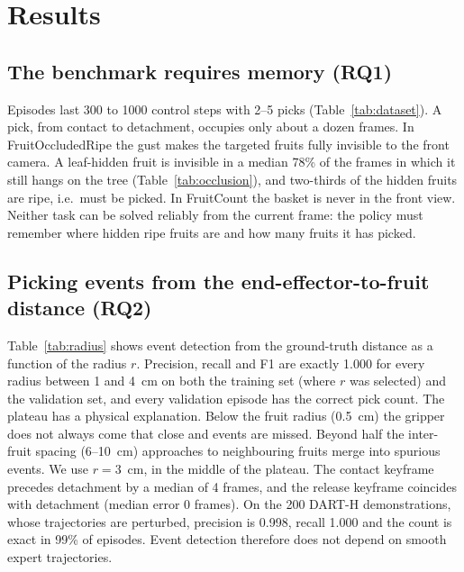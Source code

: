 \section{Results}
\label{sec:results}

\subsection{The benchmark requires memory (RQ1)}
\label{sec:res_bench}
Episodes last 300 to 1000 control steps with 2--5 picks (Table~\ref{tab:dataset}). A pick, from contact to detachment, occupies only about a dozen frames. In FruitOccludedRipe the gust makes the targeted fruits fully invisible to the front camera. A leaf-hidden fruit is invisible in a median 78\% of the frames in which it still hangs on the tree (Table~\ref{tab:occlusion}), and two-thirds of the hidden fruits are ripe, i.e.\ must be picked. In FruitCount the basket is never in the front view. Neither task can be solved reliably from the current frame: the policy must remember where hidden ripe fruits are and how many fruits it has picked.

\subsection{Picking events from the end-effector-to-fruit distance (RQ2)}
\label{sec:res_events}
Table~\ref{tab:radius} shows event detection from the ground-truth distance as a function of the radius $r$. Precision, recall and F1 are exactly 1.000 for every radius between 1 and 4~cm on both the training set (where $r$ was selected) and the validation set, and every validation episode has the correct pick count. The plateau has a physical explanation. Below the fruit radius (0.5~cm) the gripper does not always come that close and events are missed. Beyond half the inter-fruit spacing (6--10~cm) approaches to neighbouring fruits merge into spurious events. We use $r=3$~cm, in the middle of the plateau. The contact keyframe precedes detachment by a median of 4 frames, and the release keyframe coincides with detachment (median error 0 frames). On the 200 DART-H demonstrations, whose trajectories are perturbed, precision is 0.998, recall 1.000 and the count is exact in 99\% of episodes. Event detection therefore does not depend on smooth expert trajectories.


